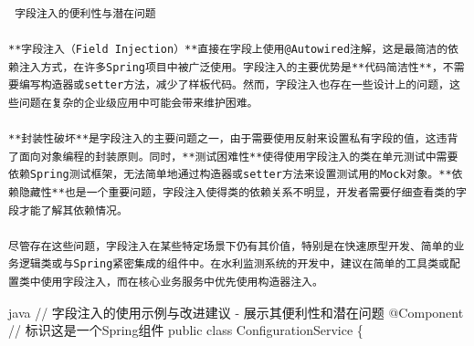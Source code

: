 \begin{lstlisting}
 字段注入的便利性与潜在问题

**字段注入（Field Injection）**直接在字段上使用@Autowired注解，这是最简洁的依赖注入方式，在许多Spring项目中被广泛使用。字段注入的主要优势是**代码简洁性**，不需要编写构造器或setter方法，减少了样板代码。然而，字段注入也存在一些设计上的问题，这些问题在复杂的企业级应用中可能会带来维护困难。

**封装性破坏**是字段注入的主要问题之一，由于需要使用反射来设置私有字段的值，这违背了面向对象编程的封装原则。同时，**测试困难性**使得使用字段注入的类在单元测试中需要依赖Spring测试框架，无法简单地通过构造器或setter方法来设置测试用的Mock对象。**依赖隐藏性**也是一个重要问题，字段注入使得类的依赖关系不明显，开发者需要仔细查看类的字段才能了解其依赖情况。

尽管存在这些问题，字段注入在某些特定场景下仍有其价值，特别是在快速原型开发、简单的业务逻辑类或与Spring紧密集成的组件中。在水利监测系统的开发中，建议在简单的工具类或配置类中使用字段注入，而在核心业务服务中优先使用构造器注入。
\end{lstlisting}

java // 字段注入的使用示例与改进建议 - 展示其便利性和潜在问题 @Component // 标识这是一个Spring组件 public class ConfigurationService \{

